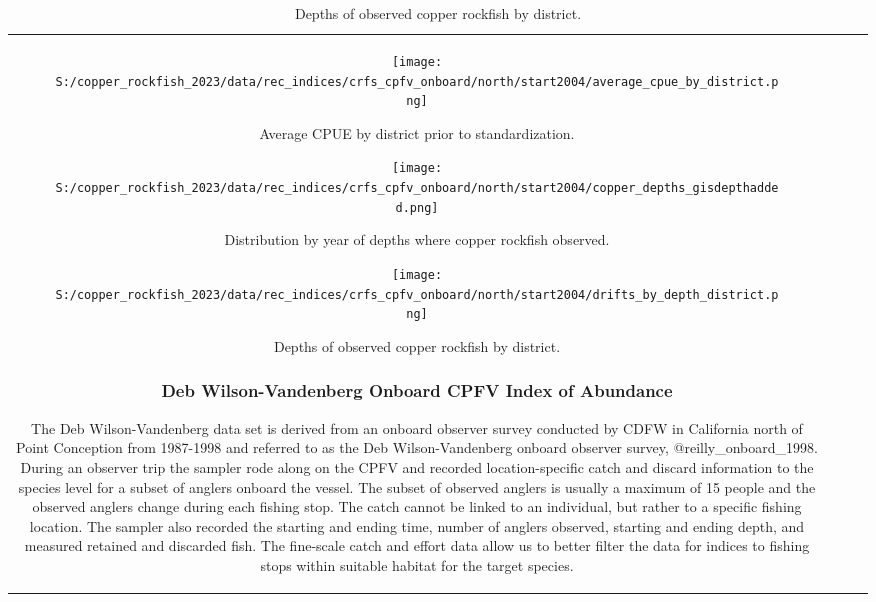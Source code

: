 \documentclass[11pt,
  letterpaper,
]{article}
\begin{document}
\begin{longtable}[t]{c>{\centering\arraybackslash}p{2cm}>{\centering\arraybackslash}p{2cm}>{\centering\arraybackslash}p{2cm}}
\begin{figure}
{\centering
\texttt{[image: S:/copper\_rockfish\_2023/data/rec\_indices/crfs\_cpfv\_onboard/north/start2004/average\_cpue\_by\_district.png]}
}
\caption{Average CPUE by district prior to standardization.\label{fig:onboard-regioncpue}}
\end{figure}

\begin{figure}
{\centering
\texttt{[image: S:/copper\_rockfish\_2023/data/rec\_indices/crfs\_cpfv\_onboard/north/start2004/copper\_depths\_gisdepthadded.png]}
}
\caption{Distribution by year of depths where copper rockfish observed.\label{fig:onboard-depths}}
\end{figure}

\begin{figure}
{\centering
\texttt{[image: S:/copper\_rockfish\_2023/data/rec\_indices/crfs\_cpfv\_onboard/north/start2004/drifts\_by\_depth\_district.png]}
}
\caption{Depths of observed copper rockfish by district.\label{fig:onboard-depths2}}
\end{figure}

\subsubsection{Deb Wilson-Vandenberg Onboard CPFV Index of Abundance}\label{dwv-cpfv-index}

The Deb Wilson-Vandenberg data set is derived from an onboard observer survey conducted by CDFW in California north of Point Conception from 1987-1998 and referred to as the Deb Wilson-Vandenberg onboard observer survey, @reilly\_onboard\_1998. During an observer trip the sampler rode along on the CPFV and recorded location-specific catch and discard information to the species level for a subset of anglers onboard the vessel. The subset of observed anglers is usually a maximum of 15 people and the observed anglers change during each fishing stop. The catch cannot be linked to an individual, but rather to a specific fishing location. The sampler also recorded the starting and ending time, number of anglers observed, starting and ending depth, and measured retained and discarded fish. The fine-scale catch and effort data allow us to better filter the data for indices to fishing stops within suitable habitat for the target species.


\end{longtable}
\end{document}
